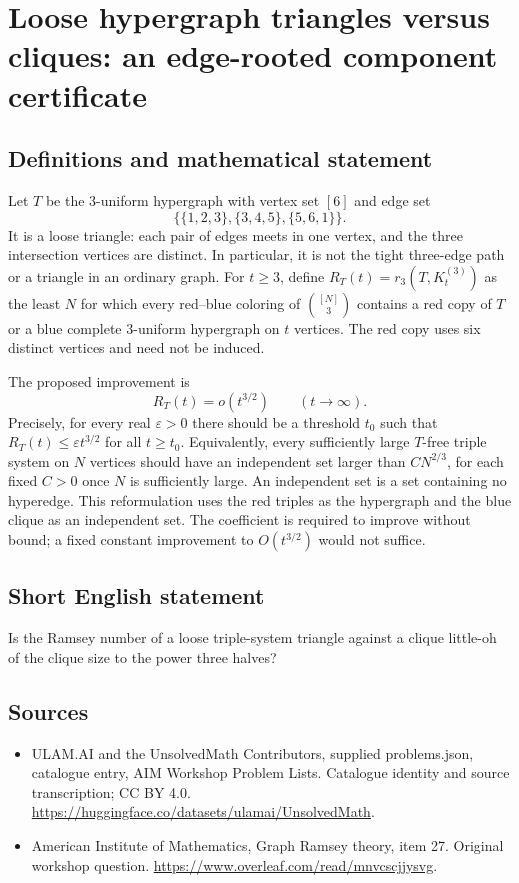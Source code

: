 \documentclass[11pt,a4paper]{article}
\begin{document}
\section*{Loose hypergraph triangles versus cliques: an edge-rooted component certificate}\label{statement}

\subsection{Definitions and mathematical statement}
Let $T$ be the $3$-uniform hypergraph with vertex set $[6]$ and edge
set
\[
              \{\{1,2,3\},\{3,4,5\},\{5,6,1\}\}.
\]
It is a loose triangle: each pair of edges meets in one vertex, and
the three intersection vertices are distinct. In particular, it is
not the tight three-edge path or a triangle in an ordinary graph.
For $t\ge3$, define $R_T(t)=r_3(T,K_t^{(3)})$ as the least $N$ for
which every red--blue coloring of $\binom{[N]}3$ contains a red copy
of $T$ or a blue complete $3$-uniform hypergraph on $t$ vertices.
The red copy uses six distinct vertices and need not be induced.

The proposed improvement is
\[
                         R_T(t)=o(t^{3/2})\qquad(t\to\infty).
\]
Precisely, for every real $\varepsilon>0$ there should be a threshold
$t_0$ such that $R_T(t)\le\varepsilon t^{3/2}$ for all $t\ge t_0$.
Equivalently, every sufficiently large $T$-free triple system on
$N$ vertices should have an independent set larger than
$C N^{2/3}$, for each fixed $C>0$ once $N$ is sufficiently large.
An independent set is a set containing no hyperedge. This reformulation
uses the red triples as the hypergraph and the blue clique as an
independent set. The coefficient is required to improve without bound;
a fixed constant improvement to $O(t^{3/2})$ would not suffice.
\subsection{Short English statement}
Is the Ramsey number of a loose triple-system triangle against a clique little-oh of the clique size to the power three halves?
\subsection{Sources}
\begin{itemize}
\item[S1] ULAM.AI and the UnsolvedMath Contributors, supplied problems.json, catalogue entry, AIM Workshop Problem Lists. Catalogue identity and source transcription; CC BY 4.0.
\url{https://huggingface.co/datasets/ulamai/UnsolvedMath}.
\item[S2] American Institute of Mathematics, Graph Ramsey theory, item 27. Original workshop question.
\url{https://www.overleaf.com/read/mnvcscjjysvg}.
\end{itemize}
\end{document}
